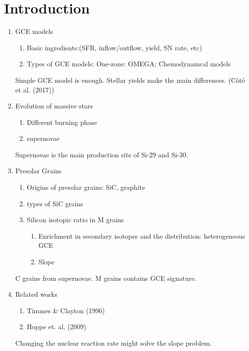 \documentclass[letterpaper,12pt]{article}
\begin{document}
\section{Introduction}
\begin{enumerate}
    \item GCE models
    \begin{enumerate}
        \item Basic ingredients:(SFR, inflow/outflow, yield, SN rate, etc)
        \item Types of GCE models: One-zone: OMEGA; Chemodynamcal models
    \end{enumerate}

    Simple GCE model is enough. Stellar yields make the main differences. (Côté et al. (2017))
    
    \item Evolution of massive stars
        \begin{enumerate}
            \item Different burning phase
            \item supernovae
        \end{enumerate}

    Supernovae is the main production site of Si-29 and Si-30.
    
    \item Presolar Grains
        \begin{enumerate}
            \item Origins of presolar grains: SiC, graphite
            \item types of SiC grains
            \item Silicon isotopic ratio in M grains
            \begin{enumerate}
                \item Enrichment in secondary isotopes and the distribution: heterogeneous GCE 
                \item Slope
            \end{enumerate}
        \end{enumerate}

    C grains from supernovae. M grains contains GCE signature. 

    \item Related works
    \begin{enumerate}
        \item Timmes \& Clayton (1996)
        \item Hoppe et. al. (2009)
    \end{enumerate}
    Changing the nuclear reaction rate might solve the slope problem.
\end{enumerate}
\end{document}
